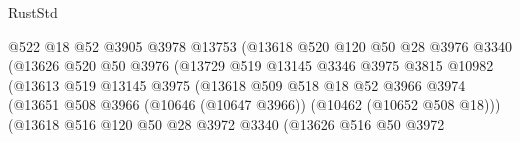 \begin{lexlean}{RustStd}
\begin{coremodule}
                                      @522
                                      @18
                                      @52
                                      @3905
                                      @3978
                                      @13753
                                      (@13618
                                        @520
                                        @120
                                        @50
                                        @28
                                        @3976
                                        @3340
                                        (@13626
                                          @520
                                          @50
                                          @3976
                                          (@13729
                                            @519
                                            @13145
                                            @3346
                                            @3975
                                            @3815
                                            @10982
                                            (@13613
                                              @519
                                              @13145
                                              @3975
                                              (@13618
                                                @509
                                                @518
                                                @18
                                                @52
                                                @3966
                                                @3974
                                                (@13651
                                                  @508
                                                  @3966
                                                  (@10646 (@10647 @3966))
                                                  (@10462 (@10652 @508 @18)))
                                                (@13618
                                                  @516
                                                  @120
                                                  @50
                                                  @28
                                                  @3972
                                                  @3340
                                                  (@13626
                                                    @516
                                                    @50
                                                    @3972

\end{coremodule}
\end{lexlean}
